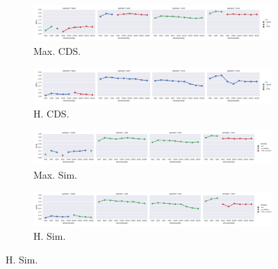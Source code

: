 \begin{landscape}
\begin{figure}
  \begin{subfigure}[t]{0.7\textwidth}
    \includegraphics[width=\textwidth]{supplement/figures/KS14-max_-selection-cds}
    \caption{Max. CDS.}
    \label{fig:}
  \end{subfigure}
  \begin{subfigure}[t]{0.7\textwidth}
    \includegraphics[width=\textwidth]{supplement/figures/KS14-heuristics-selection-cds}
    \caption{H. CDS.}
    \label{fig:}
  \end{subfigure}

  \begin{subfigure}[t]{0.7\textwidth}
    \includegraphics[width=\textwidth]{supplement/figures/KS14-max_-selection-similarity}
    \caption{Max. Sim.}
    \label{fig:}
  \end{subfigure}
  \begin{subfigure}[t]{0.7\textwidth}
    \includegraphics[width=\textwidth]{supplement/figures/KS14-heuristics-selection-similarity}
    \caption{H. Sim.}
    \label{fig:}
  \end{subfigure}


\end{figure}
\end{landscape}
